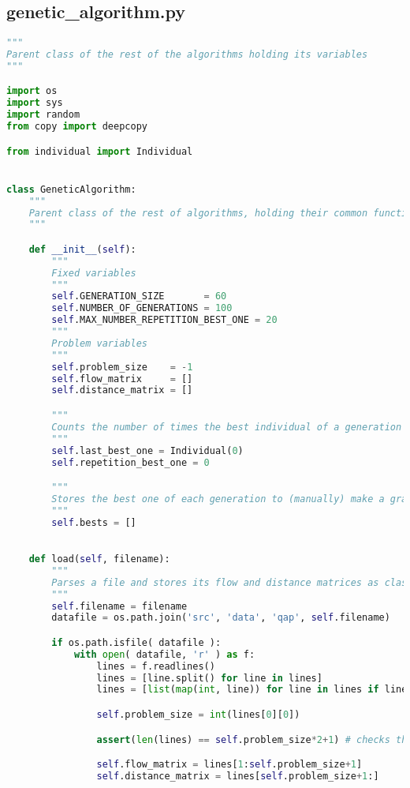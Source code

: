 \subsection*{genetic\_algorithm.py}
\begin{lstlisting}[language=python]
"""
Parent class of the rest of the algorithms holding its variables
"""

import os
import sys
import random
from copy import deepcopy

from individual import Individual


class GeneticAlgorithm:
    """
    Parent class of the rest of algorithms, holding their common functions and variables
    """

    def __init__(self):
        """
        Fixed variables
        """
        self.GENERATION_SIZE       = 60
        self.NUMBER_OF_GENERATIONS = 100
        self.MAX_NUMBER_REPETITION_BEST_ONE = 20
        """
        Problem variables
        """
        self.problem_size    = -1
        self.flow_matrix     = []
        self.distance_matrix = []

        """
        Counts the number of times the best individual of a generation is repeated to reinitialise it
        """
        self.last_best_one = Individual(0)
        self.repetition_best_one = 0

        """
        Stores the best one of each generation to (manually) make a graph
        """
        self.bests = []
        

    def load(self, filename):
        """
        Parses a file and stores its flow and distance matrices as class variables that can be accessed by the class inheriting from it
        """
        self.filename = filename
        datafile = os.path.join('src', 'data', 'qap', self.filename)

        if os.path.isfile( datafile ):
            with open( datafile, 'r' ) as f:
                lines = f.readlines()
                lines = [line.split() for line in lines]
                lines = [list(map(int, line)) for line in lines if line != []] # avoids empty lines

                self.problem_size = int(lines[0][0])

                assert(len(lines) == self.problem_size*2+1) # checks the file has a correct structure

                self.flow_matrix = lines[1:self.problem_size+1]
                self.distance_matrix = lines[self.problem_size+1:]


\end{lstlisting}
